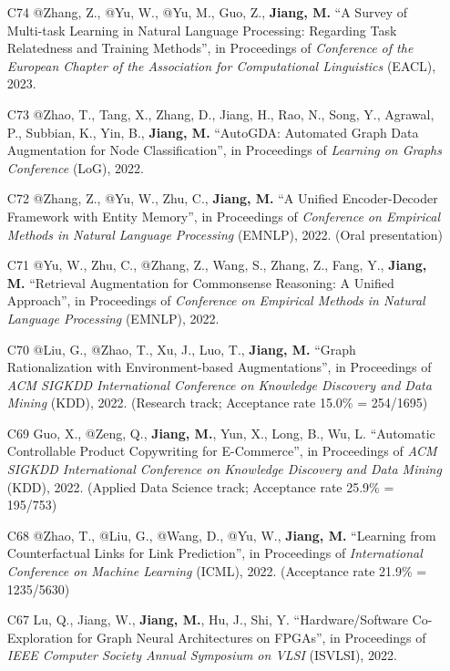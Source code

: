\documentclass[10pt]{article}
\newenvironment{myindentpar}[1]%
{\begin{list}{}%
         {\setlength{\leftmargin}{#1}}%
         \item[]%
}
{\end{list}}
\newcounter{list}
\begin{document}
\begin{myindentpar}{0.00cm}
\begin{enumerate}[leftmargin=.5cm]
\item[C74] @Zhang, Z., @Yu, W., @Yu, M., Guo, Z., \textbf{Jiang, M.} ``A Survey of Multi-task Learning in Natural Language Processing: Regarding Task Relatedness and Training Methods'', in Proceedings of \textit{Conference of the European Chapter of the Association for Computational Linguistics} (EACL), 2023.

\item[C73] @Zhao, T., Tang, X., Zhang, D., Jiang, H., Rao, N., Song, Y., Agrawal, P., Subbian, K., Yin, B., \textbf{Jiang, M.} ``AutoGDA: Automated Graph Data Augmentation for Node Classification'', in Proceedings of \textit{Learning on Graphs Conference} (LoG), 2022.

\item[C72] @Zhang, Z., @Yu, W., Zhu, C., \textbf{Jiang, M.} ``A Unified Encoder-Decoder Framework with Entity Memory'', in Proceedings of \textit{Conference on Empirical Methods in Natural Language Processing} (EMNLP), 2022. (Oral presentation)

\item[C71] @Yu, W., Zhu, C., @Zhang, Z., Wang, S., Zhang, Z., Fang, Y., \textbf{Jiang, M.} ``Retrieval Augmentation for Commonsense Reasoning: A Unified Approach'', in Proceedings of \textit{Conference on Empirical Methods in Natural Language Processing} (EMNLP), 2022.

\item[C70] @Liu, G., @Zhao, T., Xu, J., Luo, T., \textbf{Jiang, M.} ``Graph Rationalization with Environment-based Augmentations'', in Proceedings of \textit{ACM SIGKDD International Conference on Knowledge Discovery and Data Mining} (KDD), 2022. (Research track; Acceptance rate 15.0\% = 254/1695)

\item[C69] Guo, X., @Zeng, Q., \textbf{Jiang, M.}, Yun, X., Long, B., Wu, L. ``Automatic Controllable Product Copywriting for E-Commerce'', in Proceedings of \textit{ACM SIGKDD International Conference on Knowledge Discovery and Data Mining} (KDD), 2022. (Applied Data Science track; Acceptance rate 25.9\% = 195/753)

\item[C68] @Zhao, T., @Liu, G., @Wang, D., @Yu, W., \textbf{Jiang, M.} ``Learning from Counterfactual Links for Link Prediction'', in Proceedings of \textit{International Conference on Machine Learning} (ICML), 2022. (Acceptance rate 21.9\% = 1235/5630)

\item[C67] Lu, Q., Jiang, W., \textbf{Jiang, M.}, Hu, J., Shi, Y. ``Hardware/Software Co-Exploration for Graph Neural Architectures on FPGAs'', in Proceedings of \textit{IEEE Computer Society Annual Symposium on VLSI} (ISVLSI), 2022.


\end{enumerate}
\end{myindentpar}
\end{document}
